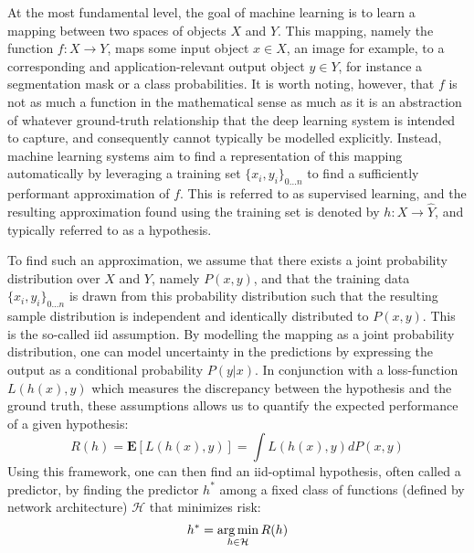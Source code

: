 		At the most fundamental level, the goal of machine learning is to learn a mapping between two spaces of objects \(X\) and \(Y\). This mapping, namely the function \(f: X \rightarrow Y\), maps some input object \(x \in X\), an image for example, to a corresponding and application-relevant output object \(y \in Y\), for instance a segmentation mask or a class probabilities. It is worth noting, however, that \(f\) is not as much a function in the mathematical sense as much as it is an abstraction of whatever ground-truth relationship that the deep learning system is intended to capture, and consequently cannot typically be modelled explicitly. Instead, machine learning systems aim to find a representation of this mapping automatically by leveraging a training set \(\{x_i, y_i\}_{0...n}\) to find a sufficiently performant approximation of \(f\). This is referred to as supervised learning, and the resulting approximation found using the training set is denoted by \(h: X \rightarrow \hat{Y}\), and typically referred to as a hypothesis.  
		        
		To find such an approximation, we assume that there exists a joint probability distribution over \(X\) and \(Y\), namely \(P(x,y)\), and that the training data \(\{x_i, y_i\}_{0...n}\) is drawn from this probability distribution such that the resulting sample distribution is independent and identically distributed to \(P(x,y)\). This is the so-called iid assumption. By modelling the mapping as a joint probability distribution, one can model uncertainty in the predictions by expressing the output as a conditional probability \(P(y|x)\). In conjunction with a loss-function \(L(h(x),y)\) which measures the discrepancy between the hypothesis and the ground truth, these assumptions allows us to quantify the expected performance of a given hypothesis:
		\begin{equation}
		    R(h) = \boldsymbol{E}[L(h(x),y)] = \int L(h(x),y) dP(x,y)
		\end{equation}
		Using this framework, one can then find an iid-optimal hypothesis, often called a predictor, by finding the predictor \(h^*\) among a fixed class of functions (defined by network architecture) \(\mathcal{H}\) that minimizes risk:
		\begin{equation}
		h^* = \operatorname*{arg\,min}_{h \in \mathcal{H}}R(h)
		\end{equation}
		
